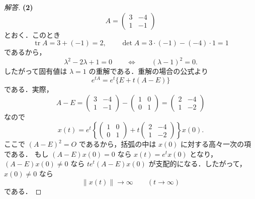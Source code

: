 \documentclass[article,paper=a4paper]{jlreq}
\begin{document}
\begin{proof}[解答]
\medskip
\textbf{(2)}
\[
  A=
  \begin{pmatrix}
    3 & -4\\
    1 & -1
  \end{pmatrix}
\]
とおく．このとき
\[
  \operatorname{tr}A=3+(-1)=2,
  \qquad
  \det A=3\cdot(-1)-(-4)\cdot1=1
\]
であるから，
\[
  \lambda^2-2\lambda+1=0
  \qquad\Longleftrightarrow\qquad
  (\lambda-1)^2=0.
\]
したがって固有値は $\lambda=1$ の重解である．重解の場合の公式より
\[
  e^{tA}=e^t\{E+t(A-E)\}
\]
である．実際，
\[
  A-E=
  \begin{pmatrix}
    3 & -4\\
    1 & -1
  \end{pmatrix}
  -
  \begin{pmatrix}
    1 & 0\\
    0 & 1
  \end{pmatrix}
  =
  \begin{pmatrix}
    2 & -4\\
    1 & -2
  \end{pmatrix}
\]
なので
\[
  x(t)
    =
    e^t
    \left\{
      \begin{pmatrix}
        1 & 0\\
        0 & 1
      \end{pmatrix}
      +
      t
      \begin{pmatrix}
        2 & -4\\
        1 & -2
      \end{pmatrix}
    \right\}x(0).
\]
ここで $(A-E)^2=O$ であるから，括弧の中は $x(0)$ に対する高々一次の項である．
もし $(A-E)x(0)=0$ なら $x(t)=e^t x(0)$ となり，$(A-E)x(0)\ne0$ なら
$t e^t(A-E)x(0)$ が支配的になる．したがって，$x(0)\ne0$ なら
\[
  \|x(t)\|\to\infty
  \qquad (t\to\infty)
\]
である．


\end{proof}
\end{document}

